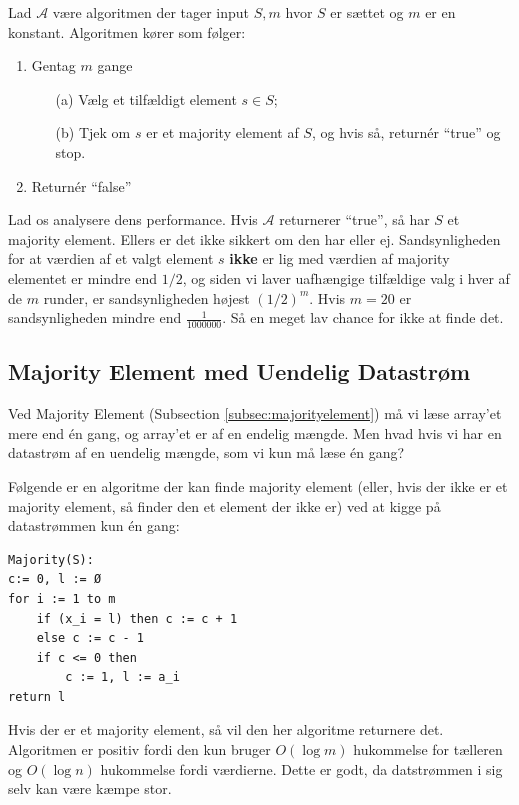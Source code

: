 \documentclass[11pt]{article}
\theoremstyle{definition}
\theoremstyle{remark}
\begin{document}
Lad $\mathcal{A}$ være algoritmen der tager input $S, m$ hvor $S$ er sættet og $m$ er en konstant. Algoritmen kører som følger:

\begin{enumerate}
\item Gentag $m$ gange
  \begin{enumerate}
  \item[(a)] Vælg et tilfældigt element $s \in S$; 
  \item[(b)] Tjek om $s$ er et majority element af $S$, og hvis så, returnér ``true'' og stop.
  \end{enumerate}
  \item\label{item:5} Returnér ``false''
\end{enumerate}

Lad os analysere dens performance.
Hvis $\mathcal{A}$ returnerer ``true'', så har $S$ et majority element. Ellers er det ikke sikkert om den har eller ej. Sandsynligheden for at værdien af et valgt element $s$ \textbf{ikke} er lig med værdien af majority elementet er mindre end $1/2$, og siden  vi laver uafhængige tilfældige valg i hver af de $m$ runder, er sandsynligheden højest $(1/2)^{m}$. Hvis $m = 20$ er sandsynligheden mindre end $\frac{1}{1 000 000}$. Så en meget lav chance for ikke at finde det.


\subsection{Majority Element med Uendelig Datastrøm}
\label{subsec:randommajority}

Ved Majority Element (Subsection \ref{subsec:majorityelement}) må vi læse array'et mere end én gang, og array'et er af en endelig mængde. Men hvad hvis vi har en datastrøm af en uendelig mængde, som vi kun må læse én gang?

Følgende er en algoritme der kan finde majority element (eller, hvis der ikke er et majority element, så finder den et element der ikke er) ved at kigge på datastrømmen kun én gang:

\begin{verbatim}
Majority(S):
c:= 0, l := Ø
for i := 1 to m
    if (x_i = l) then c := c + 1
    else c := c - 1
    if c <= 0 then
        c := 1, l := a_i
return l
\end{verbatim}

Hvis der er et majority element, så vil den her algoritme returnere det. Algoritmen er positiv fordi den kun bruger $O(\log m)$ hukommelse for tælleren og $O(\log n)$ hukommelse fordi værdierne. Dette er godt, da datstrømmen i sig selv kan være kæmpe stor.
\end{document}
